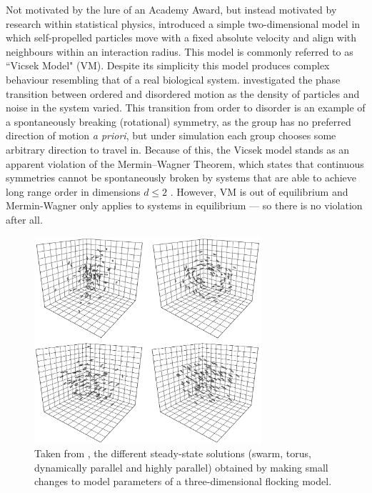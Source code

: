 Not motivated by the lure of an Academy Award, but instead motivated by research within
statistical physics, \textcite{vicsek95} introduced a simple two-dimensional model in
which self-propelled particles move with a fixed absolute velocity and align with
neighbours within an interaction radius. This model is commonly referred to as ``Vicsek
Model" (VM). Despite its simplicity this model produces complex behaviour resembling that
of a real biological system. \textcite{vicsek95} investigated the phase transition between
ordered and disordered motion as the density of particles and noise in the system varied.
This transition from order to disorder is an example of a spontaneously breaking
(rotational) symmetry, as the group has no preferred direction of motion \emph{a priori},
but under simulation each group chooses some arbitrary direction to travel in. Because of
this, the Vicsek model stands as an apparent violation of the Mermin--Wagner Theorem,
which states that continuous symmetries cannot be spontaneously broken by systems that are
able to achieve long range order in dimensions $d\leq 2$ \parencite{mermin66}. However, VM
is out of equilibrium and Mermin-Wagner only applies to systems in equilibrium --- so
there is no violation after all.

\begin{figure}[t]
	\includegraphics[width=0.75\textwidth]{couzin.png}
	\caption{Taken from \textcite{couzin02}, the different steady-state solutions (swarm, torus, 
dynamically parallel and highly parallel) obtained by making small changes to model parameters of a 
three-dimensional flocking model.}
	\label{fig:couzin}
\end{figure}

